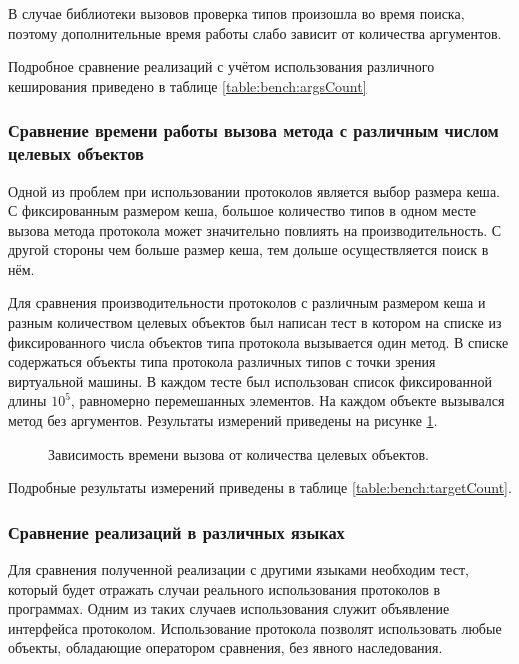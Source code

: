 В случае библиотеки вызовов проверка типов произошла во время поиска, поэтому дополнительные время работы слабо зависит от количества аргументов.

Подробное сравнение реализаций с учётом использования различного кеширования приведено в таблице \ref{table:bench:argsCount}

\subsubsection{Сравнение времени работы вызова метода с различным числом целевых объектов}
Одной из проблем при использовании протоколов является выбор размера кеша. С фиксированным размером кеша, большое количество типов в одном месте вызова метода протокола может значительно повлиять на  производительность. С другой стороны чем больше размер кеша, тем дольше осуществляется поиск в нём.

Для сравнения производительности протоколов с различным размером кеша и разным количеством целевых объектов был написан тест в котором на списке из фиксированного числа объектов типа протокола вызывается один метод. В списке содержаться объекты типа протокола различных типов с точки зрения виртуальной машины. В каждом тесте был использован список фиксированной длины $10^5$, равномерно перемешанных элементов. На каждом объекте вызывался метод без аргументов. Результаты измерений приведены на рисунке \ref{plot:bench:targetCount}.
\begin{figure}
\caption{\label{plot:bench:targetCount}Зависимость времени вызова от количества целевых объектов.}
\end{figure}

Подробные результаты измерений приведены в таблице \ref{table:bench:targetCount}.

\subsubsection{Сравнение реализаций в различных языках}
Для сравнения полученной реализации с другими языками необходим тест, который будет отражать случаи реального использования протоколов в программах. Одним из таких случаев использования служит объявление интерфейса  протоколом. Использование протокола  позволят использовать любые объекты, обладающие оператором сравнения, без явного наследования.

